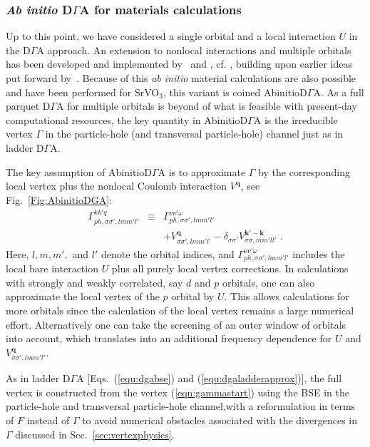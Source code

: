 \documentclass[rmp,aps,reprint,amsmath,amssymb,superscriptaddress,showpacs,nofootinbib]{revtex4-1}
\begin{document}
\subsubsection{{\em Ab initio} D\texorpdfstring{$\Gamma$}{G}A for materials calculations}
\label{sec:abinitioDGA}

Up to this point, we have considered a single orbital and a local interaction $U$ in the D$\Gamma$A approach. An extension to  nonlocal interactions and multiple orbitals has  been developed and implemented by~ and , cf. , building upon earlier ideas put forward by~. Because of this {\em ab initio} material calculations are also possible and have been performed for SrVO$_3$, this variant is coined AbinitioD$\Gamma$A. As a full parquet  D$\Gamma$A for multiple orbitals is beyond of what is feasible with present-day computational resources, the key quantity in AbinitioD$\Gamma$A is the  irreducible vertex $\Gamma$ in the particle-hole (and transversal particle-hole) channel just as in ladder D$\Gamma$A. 

The key assumption of AbinitioD$\Gamma$A is to approximate  $\Gamma$ by the corresponding local vertex plus the nonlocal Coulomb interaction ${{V}}^{\mathbf q}$, see Fig.~\ref{Fig:AbinitioDGA}:
\begin{eqnarray}
\label{eqn:gammastart}
  \Gamma^{{k}{k}'q}_{ph, \sigma\sigma',  lmm'l'} & \equiv & \Gamma^{\nu\nu'\omega}_{ ph, \sigma\sigma', lmm' l'} \nonumber \\ && + {{V}}^{{\mathbf q}}_{\sigma\sigma',lmm' l'}- \delta_{\sigma\sigma'} V^{{\mathbf k}'-{\mathbf k}}_{\sigma\sigma, mm' ll'} \; . 
\end{eqnarray}
Here, $l, m, m',$ and $l'$ denote the orbital indices, and  $\Gamma^{\nu\nu'\omega}_{ ph,\sigma\sigma',lmm' l'}$ includes the local bare interaction $U$ plus all purely local vertex corrections. In calculations with strongly and weakly correlated, say $d$ and $p$ orbitals, one can also approximate the local vertex of the $p$ orbital by $U$. This allows calculations for more orbitals since the calculation of the local vertex remains a large numerical effort. Alternatively one can take the screening of an outer window of orbitals into account, which translates into an additional frequency dependence for $U$ and  ${{V}}^{{\mathbf q}}_{\sigma\sigma',lmm' l'}$.

As in ladder D$\Gamma$A [Eqs.~(\ref{equ:dgabse}) and (\ref{equ:dgaladderapprox})], the full vertex is constructed from the vertex (\ref{eqn:gammastart}) using the BSE in the particle-hole and transversal particle-hole channel,with a reformulation in terms of $F$ instead of $\Gamma$ to avoid numerical obstacles associated with the divergences in $\Gamma$ discussed in Sec.~\ref{sec:vertexphysics}.
\end{document}

